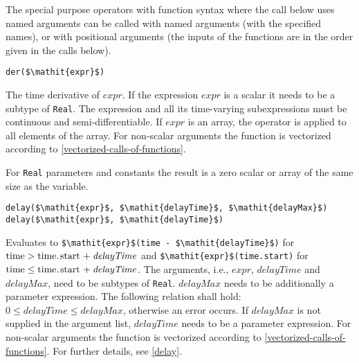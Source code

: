 The special purpose operators with function syntax where the call below uses named arguments can be called with named arguments (with the specified names), or with positional arguments (the inputs of the functions are in the order given in the calls below).

\begin{operatordefinition}[der]
\begin{synopsis}\begin{lstlisting}
der($\mathit{expr}$)
\end{lstlisting}\end{synopsis}
\begin{semantics}
The time derivative of $\mathit{expr}$.  If the expression $\mathit{expr}$ is a scalar it needs to be a subtype of \lstinline!Real!.  The expression and all its time-varying subexpressions must be continuous and semi-differentiable.  If $\mathit{expr}$ is an array, the operator is applied to all elements of the array.  For non-scalar arguments the function is vectorized according to \cref{vectorized-calls-of-functions}.
\begin{nonnormative}
For \lstinline!Real! parameters and constants the result is a zero scalar or array of the same size as the variable.
\end{nonnormative}
\end{semantics}
\end{operatordefinition}

\begin{operatordefinition}[delay]
\begin{synopsis}\begin{lstlisting}
delay($\mathit{expr}$, $\mathit{delayTime}$, $\mathit{delayMax}$)
delay($\mathit{expr}$, $\mathit{delayTime}$)
\end{lstlisting}\end{synopsis}
\begin{semantics}
Evaluates to \lstinline!$\mathit{expr}$(time - $\mathit{delayTime}$)! for $\text{\lstinline!time!} > \text{\lstinline!time.start!} + \mathit{delayTime}$ and \lstinline!$\mathit{expr}$(time.start)! for $\text{\lstinline!time!} \leq \text{\lstinline!time.start!} + \mathit{delayTime}$.  The arguments, i.e., $\mathit{expr}$, $\mathit{delayTime}$ and $\mathit{delayMax}$, need to be subtypes of \lstinline!Real!.  $\mathit{delayMax}$ needs to be additionally a parameter expression.  The following relation shall hold: $0 \leq \mathit{delayTime} \leq \mathit{delayMax}$, otherwise an error occurs.  If $\mathit{delayMax}$ is not supplied in the argument list, $\mathit{delayTime}$ needs to be a parameter expression.  For non-scalar arguments the function is vectorized according to \cref{vectorized-calls-of-functions}.  For further details, see \cref{delay}.
\end{semantics}
\end{operatordefinition}

